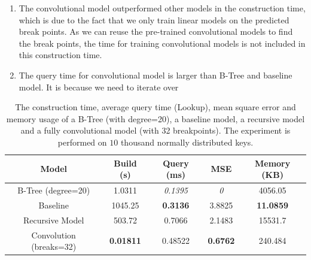 \begin{enumerate}
	\item The convolutional model outperformed other models in the construction time, which is due to the fact that we only train linear models on the predicted break points. As we can reuse the pre-trained convolutional models to find the break points, the time for training convolutional models is not included in this construction time.
	\item The query time for convolutional model is larger than B-Tree and baseline model. It is because we need to iterate over 
\end{enumerate}


\begin{table}[h!]
\centering
\begin{tabular}{ |c|c|c|c|c| }
\hline
Model & Build (s) & Query (ms) & MSE & Memory (KB)\\ 
\hline
B-Tree (degree=20) & 1.0311 & \textit{0.1395} & \textit{0} & 4056.05 \\ 
\hline
Baseline & 1045.25 & \textbf{0.3136} & 3.8825 & \textbf{11.0859} \\
\hline
Recursive Model & 503.72 & 0.7066 & 2.1483 & 15531.7\\ 
\hline
Convolution (breaks=32) & \textbf{0.01811} & 0.48522 & \textbf{0.6762} & 240.484 \\
\hline
\end{tabular}
\caption{The construction time, average query time (Lookup), mean square error and memory usage of a B-Tree (with degree=20), a baseline model, a recursive model and a fully convolutional model (with 32 breakpoints). The experiment is performed on $10$ thousand normally distributed keys.} 
\label{fig:conv_table}
\end{table}

